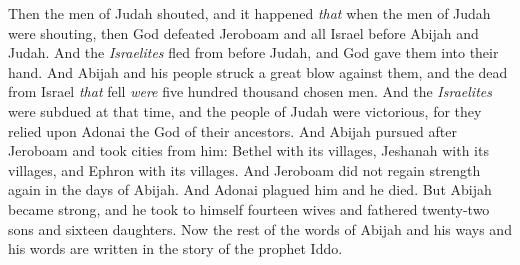 \begin{biblechapter}
\verse Then the men of Judah shouted, and it happened \textit{that} when the men of Judah were shouting, then God defeated Jeroboam and all Israel before Abijah and Judah.
\verse And the \textit{Israelites} fled from before Judah, and God gave them into their hand.
\verse And Abijah and his people struck a great blow against them, and the dead from Israel \textit{that} fell \textit{were} five hundred thousand chosen men.
\verse And the \textit{Israelites} were subdued at that time, and the people of Judah were victorious, for they relied upon Adonai the God of their ancestors.
\verse And Abijah pursued after Jeroboam and took cities from him: Bethel with its villages, Jeshanah with its villages, and Ephron with its villages.
\verse And Jeroboam did not regain strength again in the days of Abijah. And Adonai plagued him and he died.
\verse But Abijah became strong, and he took to himself fourteen wives and fathered twenty-two sons and sixteen daughters.
\verse Now the rest of the words of Abijah and his ways and his words are written in the story of the prophet Iddo.
\end{biblechapter}

